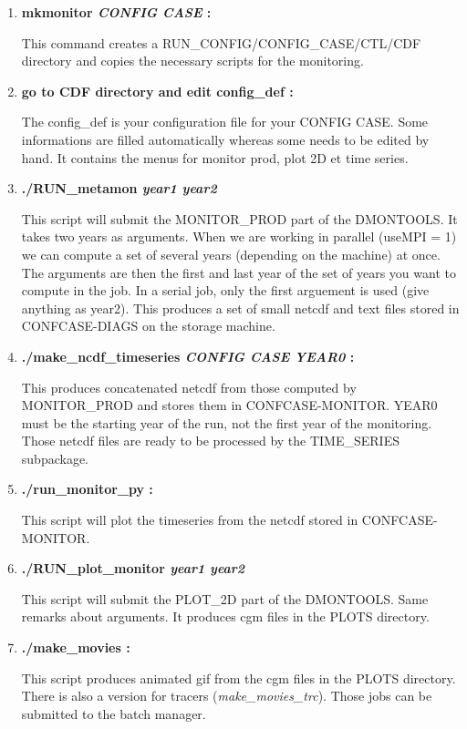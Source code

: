 \documentclass[a4paper,11pt]{article}
\begin{document}
\begin{enumerate}
\item \textbf{mkmonitor \textit{CONFIG CASE} :}

This command creates a RUN\_CONFIG/CONFIG\_CASE/CTL/CDF directory and copies the necessary
scripts for the monitoring.

\item \textbf{go to CDF directory and edit config\_def :}

The config\_def is your configuration file for your CONFIG CASE. Some informations are
filled automatically whereas some needs to be edited by hand. It contains the menus for monitor prod,
plot 2D et time series.

\item \textbf{./RUN\_metamon \textit{year1 year2}}

This script will submit the MONITOR\_PROD part of the DMONTOOLS. It takes two years as arguments. When we are working in parallel
(useMPI = 1) we can compute a set of several years (depending on the machine) at once. The arguments are then the first and last year
of the set of years you want to compute in the job. In a serial job, only the first arguement is used (give anything as year2).
This produces a set of small netcdf and text files stored in CONFCASE-DIAGS on the storage machine.

\item \textbf{./make\_ncdf\_timeseries \textit{CONFIG CASE YEAR0} :}

This produces concatenated netcdf from those computed by MONITOR\_PROD and stores them in CONFCASE-MONITOR. 
YEAR0 must be the starting year of the run, not the first year of the monitoring.
Those netcdf files are ready to be processed by the TIME\_SERIES subpackage.

\item \textbf{./run\_monitor\_py :}

This script will plot the timeseries from the netcdf stored in CONFCASE-MONITOR. 

\item \textbf{./RUN\_plot\_monitor \textit{year1 year2}}

This script will submit the PLOT\_2D part of the DMONTOOLS. Same remarks about arguments.
It produces cgm files in the PLOTS directory.

\item \textbf{./make\_movies :}

This script produces animated gif from the cgm files in the PLOTS directory. There is also a version for tracers
(\textit{make\_movies\_trc}). Those jobs can be submitted to the batch manager.

\end{enumerate}
\end{document}
